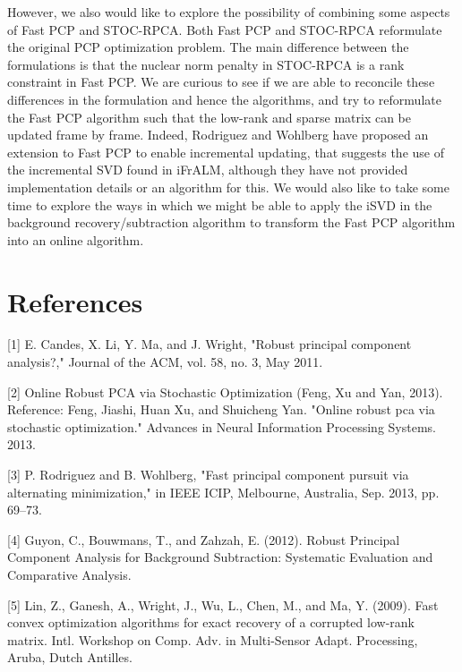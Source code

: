 \documentclass[oneside]{article}
\begin{document}
However, we also would like to explore the possibility of combining some aspects of Fast PCP and STOC-RPCA. Both Fast PCP and STOC-RPCA reformulate the original PCP optimization problem. The main difference between the formulations is that the nuclear norm penalty in STOC-RPCA is a rank constraint in Fast PCP. We are curious to see if we are able to reconcile these differences in the formulation and hence the algorithms, and try to reformulate the Fast PCP algorithm such that the low-rank and sparse matrix can be updated frame by frame. Indeed, Rodriguez and Wohlberg have proposed an extension to Fast PCP to enable incremental updating, that suggests the use of the incremental SVD found in iFrALM, although they have not provided implementation details or an algorithm for this. We would also like to take some time to explore the ways in which we might be able to apply the iSVD in the background recovery/subtraction algorithm to transform the Fast PCP algorithm into an online algorithm.

\section{References}
[1] \hspace*{8pt} E. Candes, X. Li, Y. Ma, and J. Wright, "Robust principal component analysis?," Journal of the ACM, vol. 58,
no. 3, May 2011.

[2] \hspace*{8pt}Online Robust PCA via Stochastic Optimization	(Feng, Xu and Yan, 2013). Reference: Feng, Jiashi, Huan Xu, and Shuicheng Yan. "Online robust pca via stochastic optimization." Advances in Neural Information Processing Systems. 2013.

[3] \hspace*{8pt}P. Rodriguez and B. Wohlberg, "Fast principal component pursuit via alternating minimization," in IEEE ICIP, Melbourne, Australia, Sep. 2013, pp. 69–73.

[4] \hspace*{8pt}Guyon, C., Bouwmans, T., and Zahzah, E. (2012). Robust Principal Component Analysis for Background Subtraction: Systematic Evaluation and Comparative Analysis.

[5] \hspace*{8pt}Lin, Z., Ganesh, A., Wright, J., Wu, L., Chen, M., and Ma, Y. (2009). Fast convex optimization algorithms for exact recovery of a corrupted low-rank matrix. Intl. Workshop on Comp. Adv. in Multi-Sensor Adapt. Processing, Aruba, Dutch Antilles.
\end{document}
